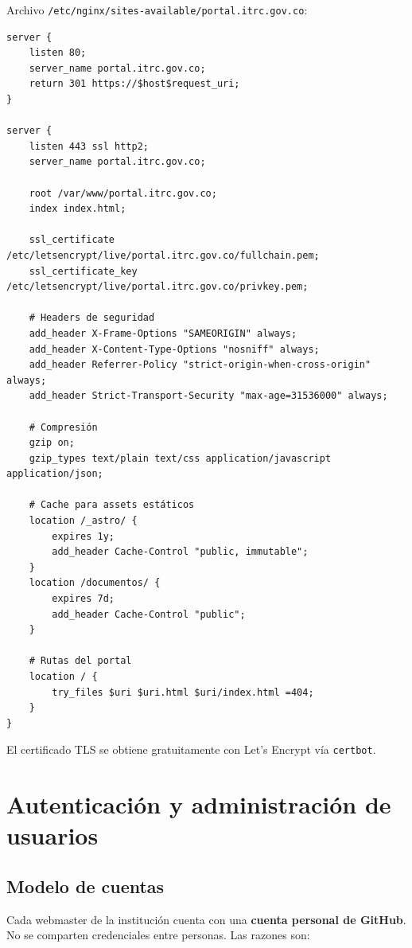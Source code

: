 \documentclass[11pt,a4paper]{article}
\begin{document}
Archivo \texttt{/etc/nginx/sites-available/portal.itrc.gov.co}:

\begin{small}
\begin{verbatim}
server {
    listen 80;
    server_name portal.itrc.gov.co;
    return 301 https://$host$request_uri;
}

server {
    listen 443 ssl http2;
    server_name portal.itrc.gov.co;

    root /var/www/portal.itrc.gov.co;
    index index.html;

    ssl_certificate     /etc/letsencrypt/live/portal.itrc.gov.co/fullchain.pem;
    ssl_certificate_key /etc/letsencrypt/live/portal.itrc.gov.co/privkey.pem;

    # Headers de seguridad
    add_header X-Frame-Options "SAMEORIGIN" always;
    add_header X-Content-Type-Options "nosniff" always;
    add_header Referrer-Policy "strict-origin-when-cross-origin" always;
    add_header Strict-Transport-Security "max-age=31536000" always;

    # Compresión
    gzip on;
    gzip_types text/plain text/css application/javascript application/json;

    # Cache para assets estáticos
    location /_astro/ {
        expires 1y;
        add_header Cache-Control "public, immutable";
    }
    location /documentos/ {
        expires 7d;
        add_header Cache-Control "public";
    }

    # Rutas del portal
    location / {
        try_files $uri $uri.html $uri/index.html =404;
    }
}
\end{verbatim}
\end{small}

El certificado TLS se obtiene gratuitamente con Let's Encrypt vía \texttt{certbot}.

\newpage

\section{Autenticación y administración de usuarios}

\subsection{Modelo de cuentas}

Cada webmaster de la institución cuenta con una \textbf{cuenta personal de GitHub}. No se comparten credenciales entre personas. Las razones son:
\end{document}
